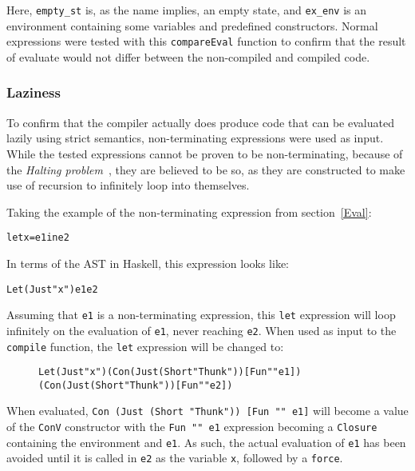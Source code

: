 \noindent Here, \texttt{empty\_st} is, as the name implies, an empty state, and
\texttt{ex\_env} is an environment containing some variables and predefined
constructors. Normal expressions were tested with this \texttt{compareEval}
function to confirm that the result of evaluate would not differ between the
non-compiled and compiled code. 


\subsubsection{Laziness}

To confirm that the compiler actually does produce code that can be evaluated
lazily using strict semantics, non-terminating expressions were used as input.
While the tested expressions cannot be proven to be non-terminating, because of
the \textit{Halting problem}~\cite{haltingproblem}, they are believed to be so,
as they are constructed to make use of recursion to infinitely loop into
themselves.

Taking the example of the non-terminating expression from section~\ref{Eval}:
\begin{alltt}
  let x = e1 in e2
\end{alltt}
In terms of the AST in Haskell, this expression looks like:
\begin{alltt}
  Let (Just "x") e1 e2
\end{alltt}
Assuming that \texttt{e1} is a non-terminating expression, this \texttt{let}
expression will loop infinitely on the evaluation of \texttt{e1}, never reaching
\texttt{e2}. When used as input to the \texttt{compile} function, the
\texttt{let} expression will be changed to:
\begin{figure}[!ht]
\begin{alltt}
  Let (Just "x") (Con (Just (Short "Thunk")) [Fun "" e1])
                 (Con (Just (Short "Thunk")) [Fun "" e2])
\end{alltt}
\end{figure}

\noindent When evaluated, \texttt{Con (Just (Short "Thunk")) [Fun "" e1]} will
become a value of the \texttt{ConV} constructor with the \texttt{Fun "" e1}
expression becoming a \texttt{Closure} containing the environment and
\texttt{e1}. As such, the actual evaluation of \texttt{e1} has been avoided
until it is called in \texttt{e2} as the variable \texttt{x}, followed by a
\texttt{force}.
